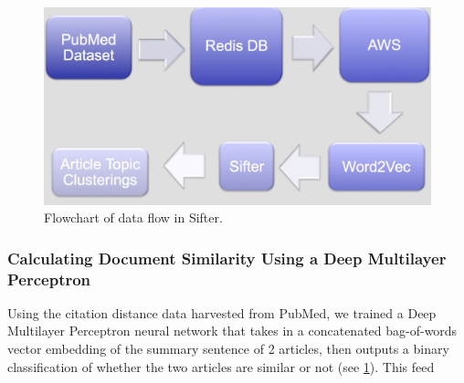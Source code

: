 \documentclass[12pt,twoside]{article}
\begin{document}
\begin{figure}[h]
\centering
\includegraphics[width=1.0\textwidth]{figures/approach.jpg}
\caption{Flowchart of data flow in Sifter.}
\label{fig:tested_model}
\end{figure}


\subsubsection{Calculating Document Similarity Using a Deep Multilayer Perceptron}


Using the citation distance data harvested from PubMed, we trained a Deep Multilayer Perceptron neural network that takes in a concatenated bag-of-words vector embedding of the summary sentence of 2 articles, then outputs a binary classification of whether the two articles are similar or not (see \ref{fig:tested_model}).
This feed 
\end{document}
